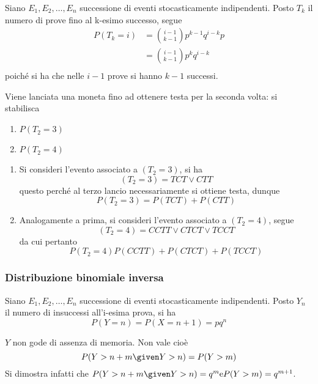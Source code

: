 \documentclass{subfiles}
\begin{document}
Siano \(E_{1}, E_{2}, \dots, E_{n}\) successione di eventi stocasticamente indipendenti. Posto \(T_{k}\) il numero di prove fino al k-esimo successo, segue
\[\begin{aligned}
        P(T_{k} = i) & = \binom{i - 1}{k - 1}p^{k - 1}q^{i - k}p \\
                     & = \binom{i - 1}{k - 1}p^{k}q^{i - k}      \\
    \end{aligned}\]
poiché si ha che nelle \(i - 1\) prove si hanno \(k - 1\) successi.

\begin{Example*}
    Viene lanciata una moneta fino ad ottenere testa per la seconda volta: si stabilisca
    \begin{multicols}{2}
        \begin{enumerate}
            \item \(P(T_{2} = 3)\)
            \item \(P(T_{2} = 4)\)
        \end{enumerate}
    \end{multicols}

    \begin{enumerate}
        \item Si consideri l'evento associato a \((T_{2} = 3)\), si ha
              \[
                  (T_{2} = 3) = TCT \lor CTT
              \]
              questo perché al terzo lancio necessariamente si ottiene testa, dunque
              \[
                  P(T_{2} = 3) = P(TCT) + P(CTT)
              \]

        \item Analogamente a prima, si consideri l'evento associato a \((T_{2} = 4)\), segue
              \[
                  (T_{2} = 4) = CCTT \lor CTCT \lor TCCT
              \]
              da cui pertanto
              \[
                  P(T_{2} = 4) P(CCTT) + P(CTCT) + P(TCCT)
              \]
    \end{enumerate}
\end{Example*}

\subsubsection{Distribuzione binomiale inversa}
Siano \(E_{1}, E_{2}, \dots, E_{n}\) successione di eventi stocasticamente indipendenti. Posto \(Y_{n}\) il numero di insuccessi all'i-esima prova, si ha
\begin{equation}
    P(Y = n) = P(X = n + 1) = pq^{n}
\end{equation}

\begin{Note*}
    \(Y\) non gode di assenza di memoria. Non vale cioè
    \[
        P(Y > n + m \given Y > n) = P(Y > m)
    \]
    Si dimostra infatti che \(P(Y > n + m \given Y > n) = q^{m} \text{e} P(Y > m) = q^{m + 1}\).
\end{Note*}
\end{document}
